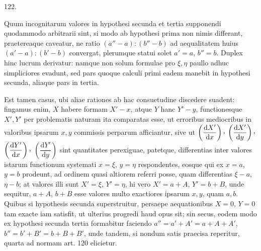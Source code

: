 \par{}\medskip
\begin{center}\hypertarget{native-169-article122}{}122.\end{center}
Quum incognitarum valores in hypothesi secunda et tertia supponendi
quodammodo arbitrarii sint, si modo ab hypothesi prima non nimis differant,
praetereaque caveatur, ne ratio $(a''-a):(b''-b)$ ad aequalitatem huius $(a'-a):(b'-b)$ convergat, plerumque statui solet $a'=a$, $b''=b$. Duplex hinc lucrum
derivatur: namque non solum formulae pro $\xi,\eta$ paullo adhuc simpliciores evadunt, sed pars quoque calculi primi eadem manebit in hypothesi secunda,
aliaque pars in tertia.

Est tamen casus, ubi aliae rationes ab hac consuetudine discedere suadent: fingamus enim, $X$ habere formam $X'-x$, atque $Y$ hanc $Y'-y$, functionesque $X',Y'$ per problematis naturam ita comparatas esse, ut erroribus
mediocribus in valoribus ipsarum $x,y$ commissis perparum afficiantur, sive ut
$\left(\dfrac{\mathrm{d}X'}{\mathrm{d}x}\right)\mathpunct{\raisebox{.45ex}{,}}$ $\left(\dfrac{\mathrm{d}X'}{\mathrm{d}y}\right)\mathpunct{\raisebox{.45ex}{,}}$ $\left(\dfrac{\mathrm{d}Y'}{\mathrm{d}x}\right)\mathpunct{\raisebox{.45ex}{,}}$ $\left(\dfrac{\mathrm{d}Y'}{\mathrm{d}y}\right)$ sint quantitates perexiguae, patetque, differentias
inter valores istarum functionum systemati $x=\xi$, $y=\eta$ respondentes, eosque
qui ex $x=a$, $y=b$ prodeunt, ad ordinem quasi altiorem referri posse, quam
differentias $\xi-a$, $\eta-b$; at valores illi sunt $X'=\xi$, $Y'=\eta$, hi vero $X'=a+A$, $Y'=b+B$, unde sequitur, $a+A$, $b+B$ esse valores multo exactiores
ipsarum $x,y$, quam $a,b$. Quibus si hypothesis secunda superstruitur, persaepe
aequationibus $X=0$, $Y=0$ tam exacte iam satisfit, ut ulterius progredi haud
opus sit; sin secus, eodem modo ex hypothesi secunda tertia formabitur faciendo
$a''=a'+A'=a+A+A'$, $b''=b'+B'=b+B+B'$, unde tandem, si
nondum satis praecisa reperitur, quarta ad normam art. 120 elicietur.
